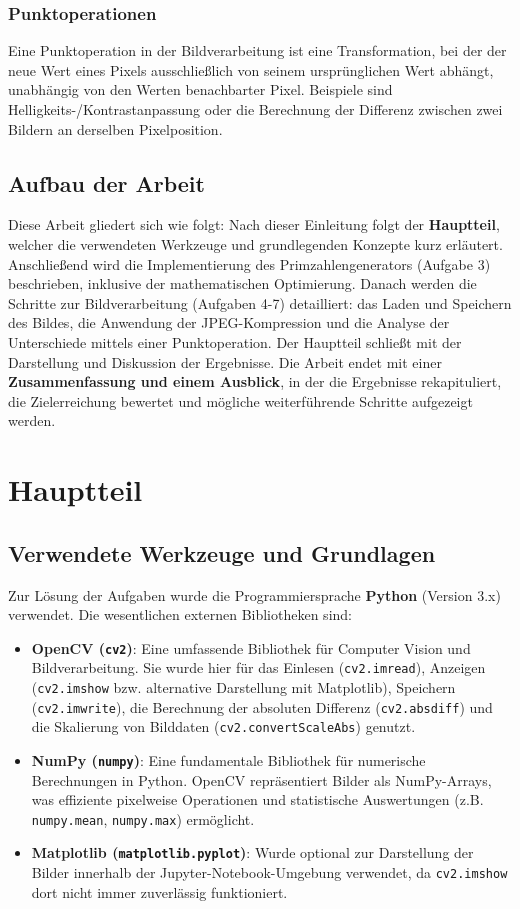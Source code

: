 \documentclass[11pt, a4paper]{article}
\begin{document}
\subsubsection{Punktoperationen}
Eine Punktoperation in der Bildverarbeitung ist eine Transformation, bei der der neue Wert eines Pixels ausschließlich von seinem ursprünglichen Wert abhängt, unabhängig von den Werten benachbarter Pixel. Beispiele sind Helligkeits-/Kontrastanpassung oder die Berechnung der Differenz zwischen zwei Bildern an derselben Pixelposition.

\subsection{Aufbau der Arbeit}
Diese Arbeit gliedert sich wie folgt: Nach dieser Einleitung folgt der \textbf{Hauptteil}, welcher die verwendeten Werkzeuge und grundlegenden Konzepte kurz erläutert. Anschließend wird die Implementierung des Primzahlengenerators (Aufgabe 3) beschrieben, inklusive der mathematischen Optimierung. Danach werden die Schritte zur Bildverarbeitung (Aufgaben 4-7) detailliert: das Laden und Speichern des Bildes, die Anwendung der JPEG-Kompression und die Analyse der Unterschiede mittels einer Punktoperation. Der Hauptteil schließt mit der Darstellung und Diskussion der Ergebnisse. Die Arbeit endet mit einer \textbf{Zusammenfassung und einem Ausblick}, in der die Ergebnisse rekapituliert, die Zielerreichung bewertet und mögliche weiterführende Schritte aufgezeigt werden.


\section{Hauptteil}

\subsection{Verwendete Werkzeuge und Grundlagen}
Zur Lösung der Aufgaben wurde die Programmiersprache \textbf{Python} (Version 3.x) verwendet. Die wesentlichen externen Bibliotheken sind:
\begin{itemize}
    \item \textbf{OpenCV (\texttt{cv2})}: Eine umfassende Bibliothek für Computer Vision und Bildverarbeitung. Sie wurde hier für das Einlesen (\texttt{cv2.imread}), Anzeigen (\texttt{cv2.imshow} bzw. alternative Darstellung mit Matplotlib), Speichern (\texttt{cv2.imwrite}), die Berechnung der absoluten Differenz (\texttt{cv2.absdiff}) und die Skalierung von Bilddaten (\texttt{cv2.convertScaleAbs}) genutzt.
    \item \textbf{NumPy (\texttt{numpy})}: Eine fundamentale Bibliothek für numerische Berechnungen in Python. OpenCV repräsentiert Bilder als NumPy-Arrays, was effiziente pixelweise Operationen und statistische Auswertungen (z.B. \texttt{numpy.mean}, \texttt{numpy.max}) ermöglicht.
    \item \textbf{Matplotlib (\texttt{matplotlib.pyplot})}: Wurde optional zur Darstellung der Bilder innerhalb der Jupyter-Notebook-Umgebung verwendet, da \texttt{cv2.imshow} dort nicht immer zuverlässig funktioniert.
\end{itemize}
\end{document}
